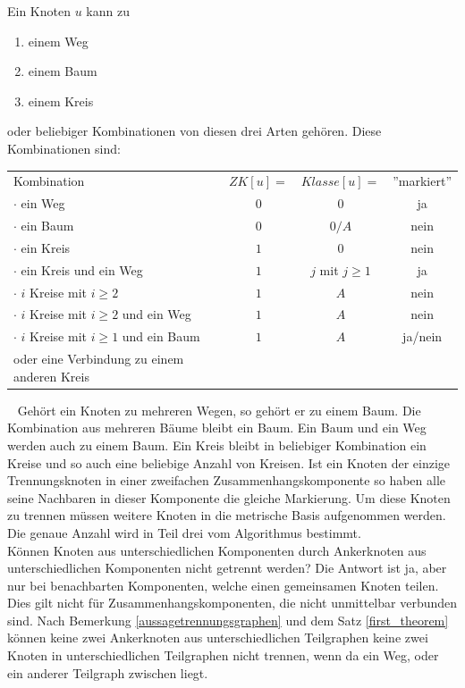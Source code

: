 Ein Knoten $u$ kann zu 
\begin{enumerate}
\item einem Weg 
\item einem Baum
\item einem Kreis
\end{enumerate}
oder beliebiger Kombinationen von diesen drei Arten gehören. Diese Kombinationen sind:\newline
~\linebreak
\begin{tabular}{lccc}
Kombination & $ZK[u]=$ & $Klasse[u]=$ & ''markiert''\\
$\cdot$ ein Weg& $0$& $0$ & ja\\
$\cdot$ ein Baum& $0$& $0/A$& nein\\
$\cdot$ ein Kreis& $1$& $0$& nein\\
$\cdot$ ein Kreis und ein Weg& $1$&$j$ mit $j\geq 1$& ja\\
$\cdot$ $i$ Kreise mit $i\geq 2$& $1$& $A$ & nein\\
$\cdot$ $i$ Kreise mit $i\geq 2$ und ein Weg &$1$& $A$& nein\\
$\cdot$ $i$ Kreise mit $i\geq 1$ und ein Baum & $1$& $A$& ja/nein\\
oder eine Verbindung zu einem anderen Kreis&&&\\
\end{tabular}
~\linebreak
Gehört ein Knoten zu mehreren Wegen, so gehört er zu einem Baum. Die Kombination aus mehreren Bäume bleibt ein Baum. Ein Baum und ein Weg werden auch zu einem Baum. Ein Kreis bleibt in beliebiger Kombination ein Kreise und so auch eine beliebige Anzahl von Kreisen.\newline\newline
Ist ein Knoten der einzige Trennungsknoten in einer zweifachen Zusammenhangskomponente so haben alle seine Nachbaren in dieser Komponente die gleiche Markierung. Um diese Knoten zu trennen müssen weitere Knoten in die metrische Basis aufgenommen werden. Die genaue Anzahl wird in Teil drei vom Algorithmus bestimmt.\\
Können Knoten aus unterschiedlichen Komponenten durch Ankerknoten aus unterschiedlichen Komponenten nicht getrennt werden?\newline
Die Antwort ist ja, aber nur bei benachbarten Komponenten, welche einen gemeinsamen Knoten teilen.
Dies gilt nicht für Zusammenhangskomponenten, die nicht unmittelbar verbunden sind. Nach Bemerkung \ref{aussagetrennungsgraphen} und dem Satz \ref{first_theorem} können keine zwei Ankerknoten aus unterschiedlichen Teilgraphen keine zwei Knoten in unterschiedlichen Teilgraphen nicht trennen, wenn da ein Weg, oder ein anderer Teilgraph zwischen liegt.\newline\newline

